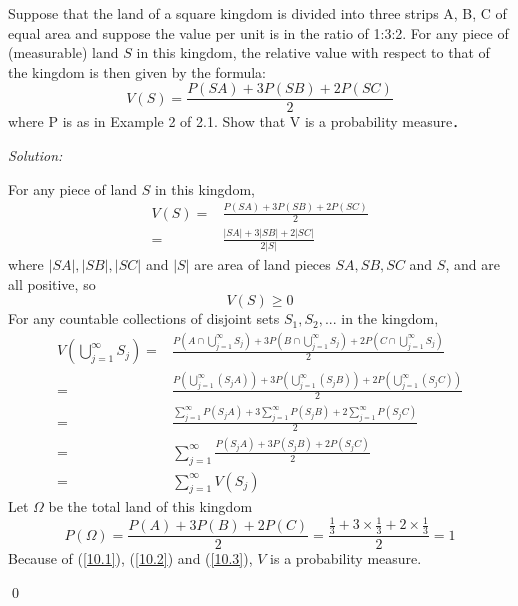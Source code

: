 \documentclass[12pt]{article}
\newenvironment{problem}[2][Problem]{\begin{trivlist}
\item[\hskip \labelsep {\bfseries #1}\hskip \labelsep {\bfseries #2.}]}{\end{trivlist}}
\newenvironment{sol}
    {\emph{Solution:}
    }
    {
    \qed
    }
\begin{document}
\begin{problem}{10}
Suppose that the land of a square kingdom is divided into three strips
A, B, C of equal area and suppose the value per unit is in the ratio
of 1:3:2. For any piece of (measurable) land $S$ in this kingdom, the
relative value with respect to that of the kingdom is then given by the
formula:
$$V(S) = \frac{P(SA)+3P(SB)+2P(SC)}{2}$$
where P is as in Example 2 of 2.1. Show that V is a probability
measure．
\end{problem}
\begin{sol}
For any piece of land $S$ in this kingdom,
\begin{align*}
V(S)=&\frac{P(SA)+3P(SB)+2P(SC)}{2}\\
=&\frac{|SA|+3|SB|+2|SC|}{2|S|}
\end{align*}
where $|SA|, |SB|, |SC|$ and $|S|$ are area of land pieces $SA, SB, SC$ and $S$, and are all positive, so
\begin{equation}
\label{10.1}
V(S)\geq0
\end{equation}
For any countable collections of disjoint sets $S_1, S_2, ...$ in the kingdom,
\begin{equation}
\label{10.2}
\begin{split}
V(\bigcup_{j=1}^{\infty}S_j)=&\frac{P(A\cap\bigcup_{j=1}^{\infty}S_j)+3P(B\cap\bigcup_{j=1}^{\infty}S_j)+2P(C\cap\bigcup_{j=1}^{\infty}S_j)}{2}\\
=&\frac{P(\bigcup_{j=1}^{\infty}(S_jA))+3P(\bigcup_{j=1}^{\infty}(S_jB))+2P(\bigcup_{j=1}^{\infty}(S_jC))}{2}\\
=&\frac{\sum_{j=1}^{\infty}P(S_jA)+3\sum_{j=1}^{\infty}P(S_jB)+2\sum_{j=1}^{\infty}P(S_jC)}{2}\\
=&\sum_{j=1}^{\infty}\frac{P(S_jA)+3P(S_jB)+2P(S_jC)}{2}\\
=&\sum_{j=1}^{\infty}V(S_j)
\end{split}
\end{equation}
Let $\Omega$ be the total land of this kingdom
\begin{equation}
\label{10.3}
P(\Omega)=\frac{P(A)+3P(B)+2P(C)}{2}=\frac{\frac{1}{3}+3\times\frac{1}{3}+2\times\frac{1}{3}}{2}=1
\end{equation}
Because of (\ref{10.1}), (\ref{10.2}) and (\ref{10.3}), $V$ is a probability measure.
\end{sol}
\end{document}
